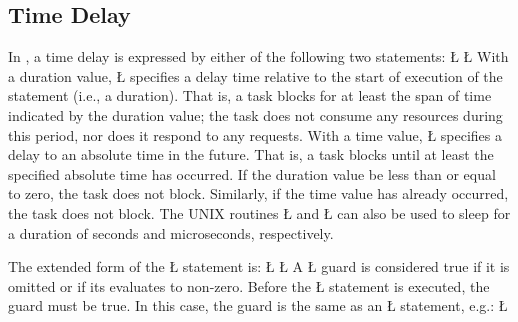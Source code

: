 \documentclass[openright,twoside]{report}
\begin{document}
\subsection{Time Delay}
\label{s:TimeDelay}

In \uC, a time delay is expressed by either of the following two statements:
\LGinlinefalse\LGbegin\lgrinde
\L{}
\CE{}\L{}
\CE{}\endlgrinde\LGend
With a duration value, \LGinlinetrue\LGbegin\lgrinde\L{}\endlgrinde\LGend{} specifies a delay time relative to the start of execution of the statement (i.e., a duration).
That is, a task blocks for at least the span of time indicated by the duration value;
the task does not consume any resources during this period, nor does it respond to any requests.
With a time value, \LGinlinetrue\LGbegin\lgrinde\L{}\endlgrinde\LGend{} specifies a delay to an absolute time in the future.
That is, a task blocks until at least the specified absolute time has occurred.
If the duration value be less than or equal to zero, the task does not block.
Similarly, if the time value has already occurred, the task does not block.
The UNIX routines \LGinlinetrue\LGbegin\lgrinde\L{}\endlgrinde\LGend{} and \LGinlinetrue\LGbegin\lgrinde\L{}\endlgrinde\LGend{} can also be used to sleep for a duration of seconds and microseconds, respectively.

The extended form of the \LGinlinetrue\LGbegin\lgrinde\L{}\endlgrinde\LGend{} statement is:
\LGinlinefalse\LGbegin\lgrinde
\L{}
\CE{}\L{\LB{}}
\CE{}\endlgrinde\LGend
{}%
%
A \LGinlinetrue\LGbegin\lgrinde\L{}\endlgrinde\LGend{} guard is considered true if it is omitted or if its  evaluates to non-zero.
Before the \LGinlinetrue\LGbegin\lgrinde\L{}\endlgrinde\LGend{} statement is executed, the guard must be true.
In this case, the guard is the same as an \LGinlinetrue\LGbegin\lgrinde\L{}\endlgrinde\LGend{} statement, e.g.:
\LGinlinefalse\LGbegin\lgrinde
\L{}
\endlgrinde\LGend
\end{document}
